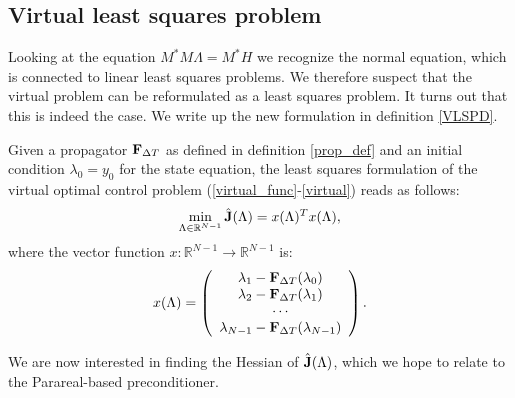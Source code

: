 \subsection{Virtual least squares problem}
Looking at the equation $M^*M\Lambda =M^*H$ we recognize the normal equation, which is connected to linear least squares problems. We therefore suspect that the virtual problem can be reformulated as a least squares problem. It turns out that this is indeed the case. We write up the new formulation in definition \ref{VLSPD}.
\begin{definition} \label{VLSPD}
Given a propagator $\bold F_{\Delta T}$ as defined in definition \ref{prop_def} and an initial condition $\lambda_0=y_0$ for the state equation, the least squares formulation of the virtual optimal control problem (\ref{virtual_func}-\ref{virtual}) reads as follows:
\begin{align}
\min_{\Lambda\in\mathbb{R}^{N-1}}\hat{\bold J}(\Lambda) = x(\Lambda)^Tx(\Lambda), \label{non_lin_LS}
\end{align}
where the vector function $x:\mathbb{R}^{N-1}\rightarrow \mathbb{R}^{N-1}$ is:
\begin{align}
x(\Lambda)= \left( \begin{array}{c}  
   \lambda_1 - \bold F_{\Delta T}(\lambda_0) \\ 
   \lambda_2 - \bold F_{\Delta T}(\lambda_1) \\
   \cdots  \\
   \lambda_{N-1} -\bold F_{\Delta T}(\lambda_{N-1}) \\
   \end{array}  \right).
\end{align}
\end{definition}
\noindent
We are now interested in finding the Hessian of $\hat{\bold J}(\Lambda)$, which we hope to relate to the Parareal-based preconditioner. 
